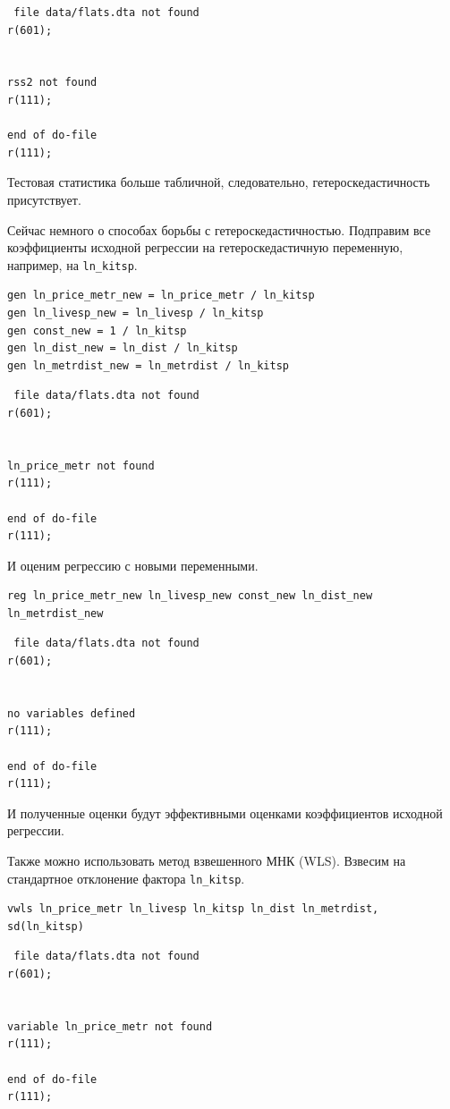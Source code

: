 \documentclass[]{book}
\begin{document}
\begin{verbatim}
 file data/flats.dta not found
r(601);


rss2 not found
r(111);

end of do-file
r(111);
\end{verbatim}

Тестовая статистика больше табличной, следовательно, гетероскедастичность присутствует.

Сейчас немного о способах борьбы с гетероскедастичностью. Подправим все коэффициенты исходной регрессии на гетероскедастичную переменную, например, на \texttt{ln\_kitsp}.

\begin{verbatim}
gen ln_price_metr_new = ln_price_metr / ln_kitsp
gen ln_livesp_new = ln_livesp / ln_kitsp
gen const_new = 1 / ln_kitsp
gen ln_dist_new = ln_dist / ln_kitsp
gen ln_metrdist_new = ln_metrdist / ln_kitsp
\end{verbatim}

\begin{verbatim}
 file data/flats.dta not found
r(601);


ln_price_metr not found
r(111);

end of do-file
r(111);
\end{verbatim}

И оценим регрессию с новыми переменными.

\begin{verbatim}
reg ln_price_metr_new ln_livesp_new const_new ln_dist_new ln_metrdist_new
\end{verbatim}

\begin{verbatim}
 file data/flats.dta not found
r(601);


no variables defined
r(111);

end of do-file
r(111);
\end{verbatim}

И полученные оценки будут эффективными оценками коэффициентов исходной регрессии.

Также можно использовать метод взвешенного МНК (WLS). Взвесим на стандартное отклонение фактора \texttt{ln\_kitsp}.

\begin{verbatim}
vwls ln_price_metr ln_livesp ln_kitsp ln_dist ln_metrdist, sd(ln_kitsp)
\end{verbatim}

\begin{verbatim}
 file data/flats.dta not found
r(601);


variable ln_price_metr not found
r(111);

end of do-file
r(111);
\end{verbatim}
\end{document}
